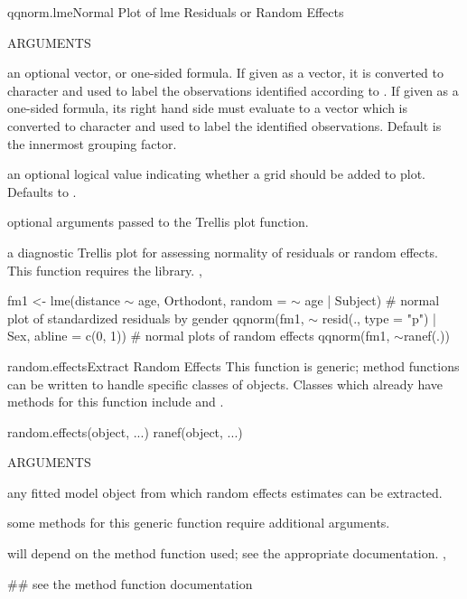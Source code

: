 \documentclass[pdftex]{article} \usepackage{url,graphicx}
\renewcommand{\Twiddle}{\mbox{\(\sim\)}}
\begin{document}
\begin{Helpfile}{qqnorm.lme}{Normal Plot of lme Residuals or Random Effects}
\begin{Argument}{ARGUMENTS}
\item[\Co{idLabels:}]
an optional vector, or one-sided formula. If given as a
vector, it is converted to character and used to label the
observations identified according to . If given as a
one-sided formula, its right hand side must evaluate to a vector
which is converted to character and used to label the identified
observations. Default is the innermost grouping factor.
\item[\Co{grid:}]
an optional logical value indicating whether a grid should
be added to plot. Defaults to .
\item[\Co{...:}]
optional arguments passed to the Trellis plot function.
\end{Argument}
a diagnostic Trellis plot for assessing normality of residuals or
random effects.
 This function requires the  library.
, 
\need 15pt
\vspace{-16pt}
\begin{Example}
fm1 <- lme(distance {\Twiddle} age, Orthodont, random = {\Twiddle} age | Subject)
# normal plot of standardized residuals by gender
qqnorm(fm1, {\Twiddle} resid(., type = "p") | Sex, abline = c(0, 1))
# normal plots of random effects
qqnorm(fm1, {\Twiddle}ranef(.))
\end{Example}
\end{Helpfile}
\begin{Helpfile}{random.effects}{Extract Random Effects}
This function is generic; method functions can be written to handle
specific classes of objects. Classes which already have methods for
this function include  and .
\begin{Example}
random.effects(object, ...)
ranef(object, ...)
\end{Example}
\begin{Argument}{ARGUMENTS}
\item[\Co{object:}]
any fitted model object from which random effects
estimates can be extracted.
\item[\Co{...:}]
some methods for this generic function require additional
arguments.
\end{Argument}
will depend on the method function used; see the appropriate documentation.
,
\need 15pt
\vspace{-16pt}
\begin{Example}
## see the method function documentation
\end{Example}
\end{Helpfile}
\end{document}
